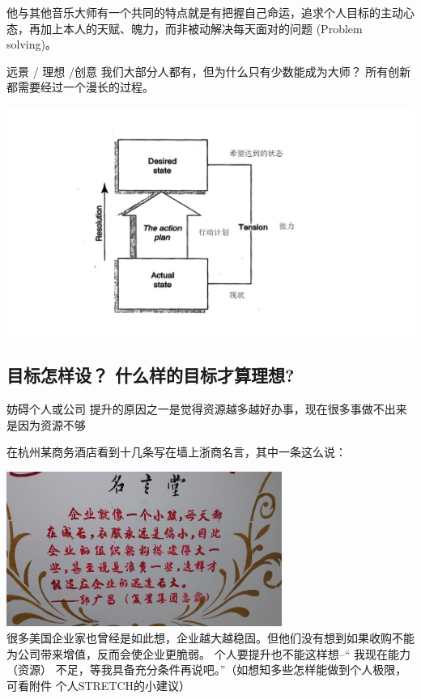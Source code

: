他与其他音乐大师有一个共同的特点就是有把握自己命运，追求个人目标的主动心态，再加上本人的天赋、魄力，而非被动解决每天面对的问题
(Problem solving)。

远景 / 理想 /创意 我们大部分人都有，但为什么只有少数能成为大师？
所有创新都需要经过一个漫长的过程。

\includegraphics[width=16cm]{liuct.jpg}\\

\hypertarget{ux76eeux6807ux600eux6837ux8bbe-ux4ec0ux4e48ux6837ux7684ux76eeux6807ux624dux7b97ux7406ux60f3}{%
\subsection{目标怎样设？
什么样的目标才算理想?}\label{ux76eeux6807ux600eux6837ux8bbe-ux4ec0ux4e48ux6837ux7684ux76eeux6807ux624dux7b97ux7406ux60f3}}

妨碍个人或公司
提升的原因之一是觉得资源越多越好办事，现在很多事做不出来是因为资源不够


在杭州某商务酒店看到十几条写在墙上浙商名言，其中一条这么说：

\includegraphics[width=9cm]{mingyant.jpg}\\
很多美国企业家也曾经是如此想，企业越大越稳固。但他们没有想到如果收购不能为公司带来增值，反而会使企业更脆弱。
个人要提升也不能这样想--`` 我现在能力 （资源）
不足，等我具备充分条件再说吧。''（如想知多些怎样能做到个人极限，可看附件
个人STRETCH的小建议）

